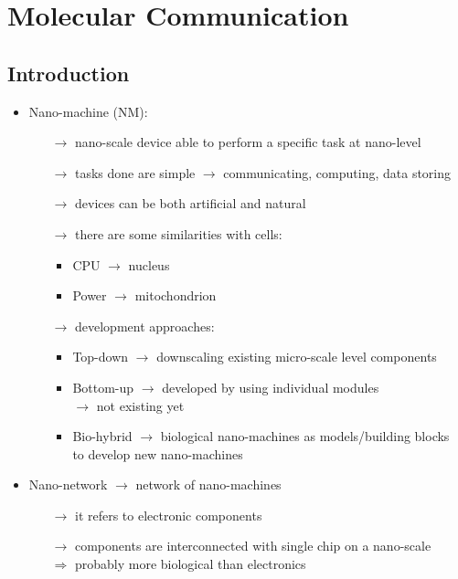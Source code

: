 \section{Molecular Communication}
\subsection{Introduction}
\begin{itemize}
    \item Nano-machine (NM):
    \begin{itemize}
        \item[$\rightarrow$] nano-scale device able to perform a specific task at nano-level
        \item[$\rightarrow$] tasks done are simple $\rightarrow$ communicating, computing, data storing
        \item[$\rightarrow$] devices can be both artificial and natural
        \item[$\rightarrow$] there are some similarities with cells:
        \begin{itemize}
            \item CPU $\rightarrow$ nucleus
            \item Power $\rightarrow$ mitochondrion
        \end{itemize}
        \item[$\rightarrow$] development approaches:
        \begin{itemize}
            \item Top-down $\rightarrow$ downscaling existing micro-scale level components
            \item Bottom-up $\rightarrow$ developed by using individual modules\\
            \hspace*{1.7cm}$\rightarrow$ not existing yet
            \item Bio-hybrid $\rightarrow$ biological nano-machines as models/building blocks\\
            \hspace*{2.1cm}to develop new nano-machines
        \end{itemize}
    \end{itemize}
    \item Nano-network $\rightarrow$ network of nano-machines
    \begin{itemize}
        \item[$\rightarrow$] it refers to electronic components
        \item[$\rightarrow$] components are interconnected with single chip on a nano-scale\\
        $\Rightarrow$ probably more biological than electronics
    \end{itemize} 
\end{itemize}
